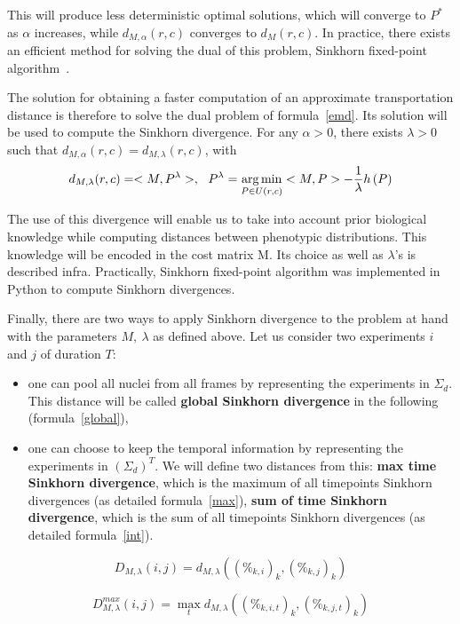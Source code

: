 This will produce less deterministic optimal solutions, which will converge to $P^*$ as $\alpha$ increases, while $d_{M, \alpha}(r,c)$ converges to $d_{M}(r,c)$. In practice, there exists an efficient method for solving the dual of this problem, Sinkhorn fixed-point algorithm~\cite{sinkhorn_original}. 

The solution for obtaining a faster computation of an approximate transportation distance is therefore to solve the dual problem of formula~\ref{emd}. Its solution will be used to compute the Sinkhorn divergence. For any $\alpha >0$, there exists $\lambda >0$ such that $d_{M, \alpha}(r,c) = d_{M, \lambda}(r,c)$, with
\[
d_{M, \lambda}(r,c) = <M,P^\lambda>,~~ P^\lambda = \operatorname*{arg\,min}_{\substack{P\in U (r,c)}} <M,P> - \dfrac{1}{\lambda} h\left( P\right)
\]

The use of this divergence will enable us to take into account prior biological knowledge while computing distances between phenotypic distributions. This knowledge will be encoded in the cost matrix M. Its choice as well as $\lambda$'s is described infra. Practically, Sinkhorn fixed-point algorithm was implemented in Python to compute Sinkhorn divergences.

Finally, there are two ways to apply Sinkhorn divergence to the problem at hand with the parameters $M,~ \lambda$ as defined above. Let us consider two experiments $i$ and $j$ of duration $T$: 

\begin{itemize}
\item one can pool all nuclei from all frames by representing the experiments in $\Sigma_d$. This distance will be called \textbf{global Sinkhorn divergence} in the following (formula~\ref{global}),
\item one can choose to keep the temporal information by representing the experiments in $\left(\Sigma_d\right) ^T$. We will define two distances from this:
\subitem \textbf{max time Sinkhorn divergence}, which is the maximum of all timepoints Sinkhorn divergences (as detailed formula~\ref{max}),
\subitem \textbf{sum of time Sinkhorn divergence}, which is the sum of all timepoints Sinkhorn divergences (as detailed formula~\ref{int}).
\end{itemize}
\begin{equation}
D_{M,\lambda}(i,j)= d_{M,\lambda}((\%_{k,i})_{k},(\%_{k,j})_{k})
\label{global}
\end{equation}

\begin{equation}
D_{M,\lambda}^{max}(i,j)= \max_t d_{M,\lambda}((\%_{k,i,t})_{k},(\%_{k,j,t})_{k})
\label{max}
\end{equation}

